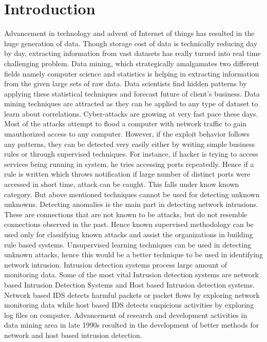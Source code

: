 \documentclass{acm_proc_article-sp}
\begin{document}
\section{Introduction}
Advancement in technology and advent of Internet of things has resulted in the huge generation of data. Though storage cost of data is technically reducing day by day, extracting information from vast datasets has really turned into real time challenging problem. Data mining, which strategically amalgamates two different fields namely computer science and statistics is helping in extracting information from the given large sets of raw data. Data scientists find hidden patterns by applying these statistical techniques and forecast future of client's business. Data mining techniques are attracted as they can be applied to any type of dataset to learn about correlations.
Cyber-attacks are growing at very fast pace these days. Most of the attacks attempt to flood a computer with network traffic to gain unauthorized access to any computer. However, if the exploit behavior follows any patterns, they can be detected very easily either by writing simple business rules or through supervised techniques. For instance, if hacker is trying to access services being running in system, he tries accessing ports repeatedly. Hence if a rule is written which throws notification if large number of distinct ports were accessed in short time, attack can be caught. This falls under know known category. But above mentioned techniques cannot be used for detecting unknown unknowns.  Detecting anomalies is the main part in detecting network intrusions. These are connections that are not known to be attacks, but do not resemble connections observed in the past. Hence known supervised methodology can be used only for classifying known attacks and assist the organizations in building rule based systems. Unsupervised learning techniques can be used in detecting unknown attacks, hence this would be a better technique to be used in identifying network intrusion.
Intrusion detection systems process large amount of monitoring data. Some of the most vital Intrusion detection systems are network based Intrusion Detection Systems and Host based Intrusion detection systems. Network based IDS detects harmful packets or packet flows by exploring network monitoring data while host based IDS detects suspicious activities by exploring log files on computer. Advancement of research and development activities in data mining area in late 1990s resulted in the development of better methods for network and host based intrusion detection.
\end{document}
